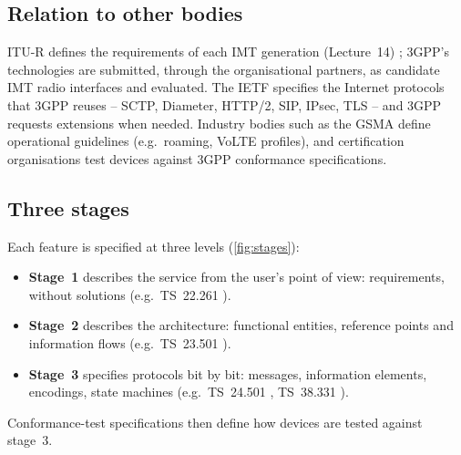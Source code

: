 \documentclass[11pt,a4paper]{article}
\begin{document}
\subsection{Relation to other bodies}
ITU-R defines the requirements of each IMT generation (Lecture~14) \cite{itu2017m2410,itu2023m2160}; 3GPP's
technologies are submitted, through the organisational partners, as candidate IMT radio interfaces and evaluated.
The IETF specifies the Internet protocols that 3GPP reuses -- SCTP, Diameter, HTTP/2, SIP, IPsec, TLS
\cite{rfc6733,rfc9113,rfc9260,rfc3261} -- and 3GPP requests extensions when needed. Industry bodies such as the
GSMA define operational guidelines (e.g.\ roaming, VoLTE profiles), and certification organisations test devices
against 3GPP conformance specifications.

\subsection{Three stages}
Each feature is specified at three levels (\cref{fig:stages}):
\begin{itemize}
  \item \textbf{Stage~1} describes the service from the user's point of view: requirements, without solutions
        (e.g.\ TS~22.261 \cite{ts22261}).
  \item \textbf{Stage~2} describes the architecture: functional entities, reference points and information flows
        (e.g.\ TS~23.501 \cite{ts23501}).
  \item \textbf{Stage~3} specifies protocols bit by bit: messages, information elements, encodings, state machines
        (e.g.\ TS~24.501 \cite{ts24501}, TS~38.331 \cite{ts38331}).
\end{itemize}
Conformance-test specifications then define how devices are tested against stage~3.

\begin{acnfigure}
  \caption{Three-stage methodology with typical specifications.}
  \label{fig:stages}
\end{acnfigure}
\end{document}
